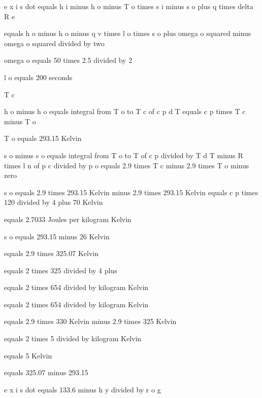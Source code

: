 e x i s dot equals h i minus h o minus T o times s i minus s o plus q times delta R e

equals h o minus h o minus q v times l o times s o plus omega o squared minus omega o squared divided by two

omega o equals 50 times 2.5 divided by 2

l o equals 200 seconds

T c

h o minus h o equals integral from T o to T c of c p d T equals c p times T c minus T o

T o equals 293.15 Kelvin

s o minus s o equals integral from T o to T of c p divided by T d T minus R times l n of p c divided by p o equals 2.9 times T c minus 2.9 times T o minus zero

s o equals 2.9 times 293.15 Kelvin minus 2.9 times 293.15 Kelvin equals c p times 120 divided by 4 plus 70 Kelvin

equals 2.7033 Joules per kilogram Kelvin

s o equals 293.15 minus 26 Kelvin

equals 2.9 times 325.07 Kelvin

equals 2 times 325 divided by 4 plus

equals 2 times 654 divided by kilogram Kelvin

equals 2 times 654 divided by kilogram Kelvin

equals 2.9 times 330 Kelvin minus 2.9 times 325 Kelvin

equals 2 times 5 divided by kilogram Kelvin

equals 5 Kelvin

equals 325.07 minus 293.15

e x i s dot equals 133.6 minus h y divided by r o g